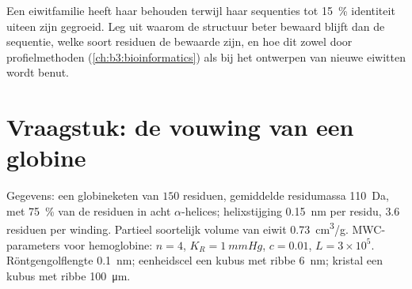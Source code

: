 \begin{exercise}[$\star\star\star$]\label{exo:b3:structural-biology:12}
Een eiwitfamilie heeft haar  behouden terwijl haar sequenties
tot \qty{15}{\%} identiteit uiteen zijn gegroeid. Leg uit waarom de
structuur beter bewaard blijft dan de sequentie, welke soort residuen
de bewaarde zijn, en hoe dit zowel door profielmethoden
(\cref{ch:b3:bioinformatics}) als bij het ontwerpen van nieuwe eiwitten
wordt benut.
\end{exercise}

\section{Vraagstuk: de vouwing van een globine}

\begin{problem}
\label{pb:b3:structural-biology:1}
Gegevens: een globineketen van $150$ residuen, gemiddelde residumassa
\qty{110}{Da}, met \qty{75}{\%} van de residuen in acht
$\alpha$-helices; helixstijging \qty{0.15}{nm} per residu, $3.6$
residuen per winding. Partieel soortelijk volume van eiwit
\qty{0.73}{cm^3/g}. MWC-parameters voor hemoglobine: $n = 4$,
$K_{R} = \qty{1}{mmHg}$, $c = 0.01$, $L = 3\times 10^{5}$.
Röntgengolflengte \qty{0.1}{nm}; eenheidscel een kubus met ribbe
\qty{6}{nm}; kristal een kubus met ribbe \qty{100}{\micro m}.


\end{problem}
